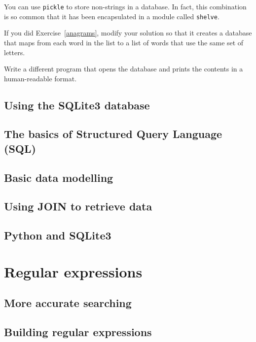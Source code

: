 You can use {\tt pickle} to store non-strings in a database.
In fact, this combination is so common that it has been
encapsulated in a module called {\tt shelve}.  



\begin{ex}


If you did Exercise~\ref{anagrams}, modify your solution so that
it creates a database that maps from each word in the list to
a list of words that use the same set of letters.

Write a different program that opens the database and prints
the contents in a human-readable format.
\end{ex}



\section{Using the SQLite3 database}

\section{The basics of Structured Query Language (SQL)}

\section{Basic data modelling}

\section{Using JOIN to retrieve data}

\section{Python and SQLite3}

\chapter{Regular expressions}

\section{More accurate searching}

\section{Building regular expressions}

